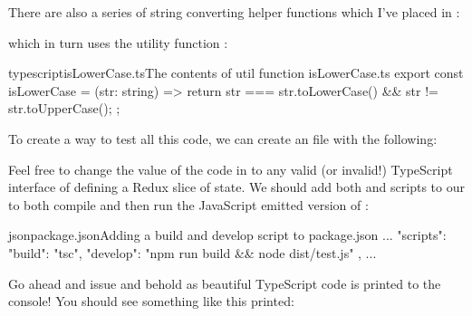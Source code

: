 \documentclass[paper=6in:9in,pagesize=pdftex,headinclude=on,footinclude=on,12pt,twoside]{scrbook}
\begin{document}
There are also a series of string converting helper functions which I've placed in :


which in turn uses the utility function :

\begin{codeInput}{typescript}{isLowerCase.ts}{The contents of util function isLowerCase.ts}
export const isLowerCase = (str: string) => {
  return str === str.toLowerCase() && str != str.toUpperCase();
};  
\end{codeInput}


To create a way to test all this code, we can create an  file with the following:


Feel free to change the value of the code in  to any valid (or invalid!) TypeScript interface of defining a Redux slice of state. We should add both  and  scripts to our  to both compile and then run the JavaScript emitted version of :

\begin{codeInput}{json}{package.json}{Adding a build and develop script to package.json}
...
"scripts": {
  "build": "tsc",
  "develop": "npm run build && node dist/test.js"
},
...
\end{codeInput}

Go ahead and issue  and behold as beautiful TypeScript code is printed to the console! You should see something like this printed:
\end{document}
